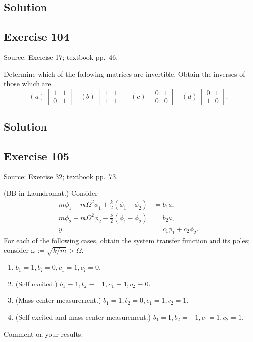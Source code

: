 \documentclass[12pt,a4paper]{article}
\newcommand{\editorial}[1]{\par\smallskip{\small\textbf{編輯註：}#1}\par}
\newlength{\questionroom}
\newenvironment{questionprompt}{%
  \begin{lrbox}{\questionbox}\begin{minipage}{\linewidth}%
}{%
  \end{minipage}\end{lrbox}%
  \setlength{\questionroom}{\dimexpr\ht\questionbox+\dp\questionbox+5.2cm\relax}%
  \ifdim\questionroom>\textheight\setlength{\questionroom}{\textheight}\fi
  \Needspace{\questionroom}%
  \noindent\usebox{\questionbox}\par
}
\begin{document}
\subsection*{Solution}
\vspace{3.5cm}


\begin{questionprompt}
\section*{Exercise 104}
\label{practice:104}
{\small Source: Exercise 17; textbook pp.~46.}\par
Determine which of the following matrices are invertible. Obtain the inverses of those which are.
\[(a)\ \begin{bmatrix}1&1\\0&1\end{bmatrix}\quad
(b)\ \begin{bmatrix}1&1\\1&1\end{bmatrix}\quad
(c)\ \begin{bmatrix}0&1\\0&0\end{bmatrix}\quad
(d)\ \begin{bmatrix}0&1\\1&0\end{bmatrix}.\]
\editorial{略去 MATLAB 核對要求。}
\end{questionprompt}
\subsection*{Solution}
\vspace{3.5cm}


\begin{questionprompt}
\section*{Exercise 105}
\label{practice:105}
{\small Source: Exercise 32; textbook pp.~73.}\par
(BB in Laundromat.) Consider
\begin{align*}
m\ddot\phi_1-m\Omega^2\phi_1+\frac{k}{2}(\phi_1-\phi_2)&=b_1u,\\
m\ddot\phi_2-m\Omega^2\phi_2-\frac{k}{2}(\phi_1-\phi_2)&=b_2u,\\
y&=c_1\phi_1+c_2\phi_2.
\end{align*}
For each of the following cases, obtain the system transfer function and its poles; consider $\omega:=\sqrt{k/m}>\Omega$.
\begin{enumerate}[label=(\alph*)]
\item $b_1=1,b_2=0,c_1=1,c_2=0$.
\item (Self excited.) $b_1=1,b_2=-1,c_1=1,c_2=0$.
\item (Mass center measurement.) $b_1=1,b_2=0,c_1=1,c_2=1$.
\item (Self excited and mass center measurement.) $b_1=1,b_2=-1,c_1=1,c_2=1$.
\end{enumerate}
Comment on your results.
\end{questionprompt}
\end{document}
